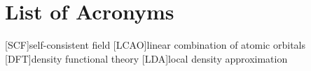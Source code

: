 
\chapter*{List of Acronyms}

\begin{acronym}[ABCDEFGHIJK]
    [SCF]{self-consistent field}
    [LCAO]{linear combination of atomic orbitals}
    [DFT]{density functional theory}
    [LDA]{local density approximation}
\end{acronym}
